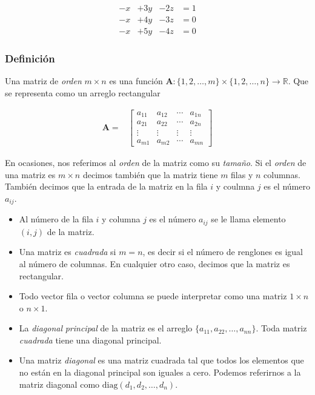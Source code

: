 \documentclass[
]{article}
\begin{document}
\begin{equation*}
  \begin{matrix}
           -x  & +3 y  & -2z & = 1  \\
           -x & +4 y  & -3z & = 0   \\
           -x & +5 y  & -4z  & = 0
  \end{matrix}
\end{equation*}

\hypertarget{definiciuxf3n-1}{%
\subsubsection{Definición}\label{definiciuxf3n-1}}

Una matriz de \emph{orden} \(m\times n\) es una función
\(\mathbf{A}:\{1,2,\ldots,m\}\times\{1,2,\ldots,n\} \rightarrow\mathbb{R}\).
Que se representa como un arreglo rectangular

\begin{equation}
\begin{array}{cc}
\mathbf{A}  =&  \begin{bmatrix}
        a_{11}  & a_{12}  & \cdots   & a_{1n}   \\
        a_{21}  & a_{22}  & \cdots   & a_{2n} \\
        \vdots   & \vdots  & \vdots   & \vdots \\
        a_{m1}  & a_{m2}  & \cdots   & a_{mn} 
  \end{bmatrix}
\end{array}
\end{equation}

En ocasiones, nos referimos al \emph{orden} de la matriz como su
\emph{tamaño}. Si el \emph{orden} de una matriz es \(m\times n\) decimos
también que la matriz tiene \(m\) filas y \(n\) columnas. También
decimos que la entrada de la matriz en la fila \(i\) y coulmna \(j\) es
el número \(a_{ij}\).

\begin{itemize}
\item
  Al número de la fila \(i\) y columna \(j\) es el número \(a_{ij}\) se
  le llama elemento \({(i,j)}\) de la matriz.
\item
  Una matriz es \emph{cuadrada} si \(m=n\), es decir si el número de
  renglones es igual al número de columnas. En cualquier otro caso,
  decimos que la matriz es rectangular.
\item
  Todo vector fila o vector columna se puede interpretar como una matriz
  \(1\times n\) o \(n\times 1\).
\item
  La \emph{diagonal} \emph{principal} de la matriz es el arreglo
  \(\{a_{11}, a_{22},\ldots, a_{nn} \}\). Toda matriz \emph{cuadrada}
  tiene una diagonal principal.
\item
  Una matriz \emph{diagonal} es una matriz cuadrada tal que todos los
  elementos que no están en la diagonal principal son iguales a cero.
  Podemos referirnos a la matriz diagonal como
  \(\mbox{diag}(d_1,d_2,\ldots, d_n)\).
\end{itemize}
\end{document}
